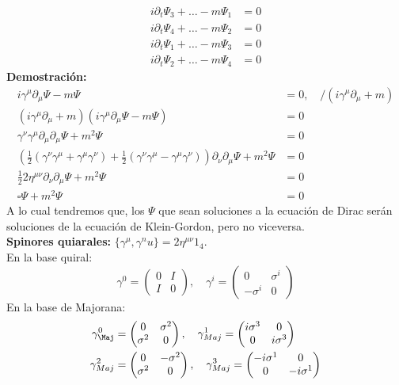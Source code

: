 \documentclass[../main.tex]{subfiles}
\begin{document}
 \begin{align*}
   i\partial_t \Psi_3 + \dots - m \Psi_1 & = 0 \\
   i\partial_t \Psi_4 + \dots - m \Psi_2 & = 0 \\
  i\partial_t\Psi_1 + \dots - m \Psi_3 & = 0 \\
   i\partial_t \Psi_2 + \dots -m \Psi_4 & = 0
 \end{align*}
 \textbf{Demostración:}
 \begin{align*}
   i\gamma^\mu \partial_\mu \Psi - m \Psi & = 0 ,\quad /\left( i\gamma^\mu \partial_\mu + m \right) \\
   \left( i\gamma^\mu \partial_\mu + m \right)\left( i\gamma^\mu \partial_\mu \Psi - m \Psi \right) & = 0 \\
   \gamma^\nu \gamma^\mu \partial_\mu \partial_\mu \Psi + m^2\Psi & = 0 \\
   \left( \frac{1}{2}\left( \gamma^\nu \gamma^\mu + \gamma^\mu \gamma^\nu  \right) + \frac{1}{2} \left( \gamma^\nu \gamma^\mu - \gamma^\mu \gamma^\nu \right) \right)\partial_\nu \partial_\mu \Psi + m^2 \Psi & = 0 \\
   \frac{1}{2} 2 \eta^{\mu \nu} \partial_\nu \partial_\mu \Psi + m^2 \Psi & = 0 \\
   \square \Psi + m^2 \Psi & = 0
 \end{align*}
 A lo cual tendremos que, los $\Psi$ que sean soluciones a la ecuación de Dirac serán soluciones de la ecuación de Klein-Gordon, pero no viceversa. \\
 \textbf{Spinores quiarales:} $\{\gamma^\mu , \gamma^nu\} = 2\eta^{\mu \nu} 1_4$. \\
 En la base quiral:
 \begin{equation*}
   \gamma^0 = \begin{pmatrix}
     0 & I \\ I & 0
   \end{pmatrix}, \quad \gamma^i = \begin{pmatrix}
     0 & \sigma^i \\ -\sigma^i & 0
   \end{pmatrix}
 \end{equation*}
 En la base de Majorana:
 \begin{align*}
   \gamma^0_{\Maj} & = \begin{pmatrix}
     0 & \sigma^2 \\ \sigma^2 & 0 
   \end{pmatrix}
   ,\quad \gamma^1_{Maj} = \begin{pmatrix}
     i\sigma^3 & 0 \\ 0 & i\sigma^3
   \end{pmatrix} \\
   \gamma^2_{Maj} & = \begin{pmatrix}
     0 & -\sigma^2 \\ \sigma^2 & 0
   \end{pmatrix}, \quad \gamma^3_{Maj} = \begin{pmatrix}
     -i\sigma^1 & 0 \\ 0 & -i\sigma^1
   \end{pmatrix}
 \end{align*}
\end{document}
